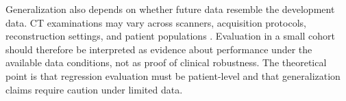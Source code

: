 Generalization also depends on whether future data resemble the development data. CT examinations may vary across scanners, acquisition protocols, reconstruction settings, and patient populations \cite{rizzo2018radiomics}. Evaluation in a small cohort should therefore be interpreted as evidence about performance under the available data conditions, not as proof of clinical robustness. The theoretical point is that regression evaluation must be patient-level and that generalization claims require caution under limited data.
